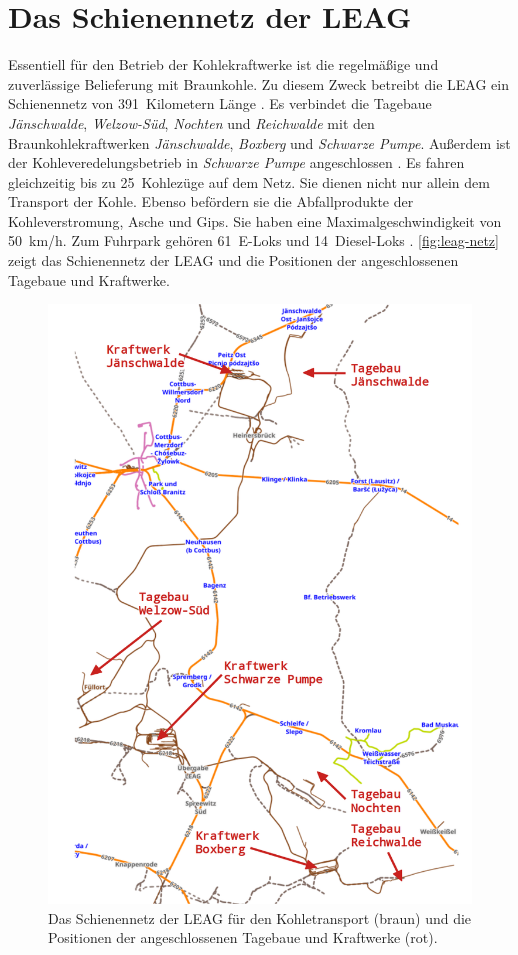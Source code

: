 \section{Das Schienennetz der LEAG}

Essentiell für den Betrieb der Kohlekraftwerke ist die regelmäßige und zuverlässige Belieferung mit Braunkohle. Zu diesem Zweck betreibt die LEAG  ein Schienennetz von 391~Kilometern Länge \cite{hertzer_eisenbahner_2018}. Es verbindet die Tagebaue \emph{Jänschwalde}, \emph{Welzow-Süd}, \emph{Nochten} und \emph{Reichwalde} mit den Braunkohlekraftwerken \emph{Jänschwalde}, \emph{Boxberg} und \emph{Schwarze Pumpe}. Außerdem ist der Kohleveredelungsbetrieb in \emph{Schwarze Pumpe} angeschlossen \cite{noauthor_tagebau_2023}. Es fahren gleichzeitig bis zu 25~Kohlezüge auf dem Netz. Sie dienen nicht nur allein dem Transport der Kohle. Ebenso befördern sie die Abfallprodukte der Kohleverstromung, Asche und Gips. Sie haben eine Maximalgeschwindigkeit von 50~km/h. Zum Fuhrpark gehören 61~E-Loks und 14~Diesel-Loks \cite{hertzer_eisenbahner_2018}. \autoref{fig:leag-netz} zeigt das Schienennetz der LEAG und die Positionen der angeschlossenen Tagebaue und Kraftwerke.

\begin{figure}[!ht]
	\centering
	\includegraphics[width=0.75\linewidth]{images/LEAG-Netz-annotated.png}
	\caption{Das Schienennetz der LEAG für den Kohletransport (braun) und die Positionen der angeschlossenen Tagebaue und Kraftwerke (rot).}
	\label{fig:leag-netz}
\end{figure}